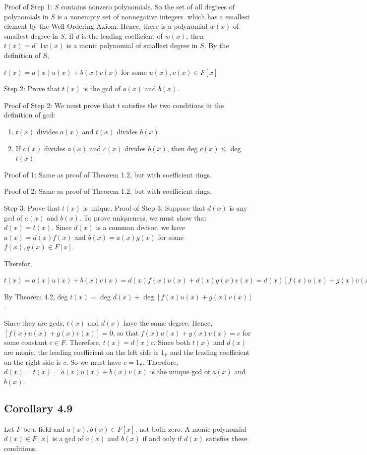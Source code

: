 \documentclass{article}
\begin{document}
Proof of Step 1: $S$ contains nonzero polynomials. So the set of all
degrees of polynomials in $S$ is a nonempty set of nonnegative integers.
which has a smallest element by the Well-Ordering Axiom. Hence, there
is a polynomial $w(x)$ of smallest degree in $S$. If $d$ is the leading coefficient of $w(x)$, then $t(x) = d^-1 w(x)$ 
is a monic polynomial of smallest
degree in $S$. By the definition of $S$,
\begin{center}
    $t(x) = a(x)u(x) + b(x)v(x)$ for some $u(x), v(x) \in F[x]$
\end{center}

Step 2: Prove that $t(x)$ is the gcd of $a(x)$ and $b(x)$.

Proof of Step 2: We must prove that $t$ satisfies the two conditions in the definition of gcd:
\begin{enumerate}
    \item $t(x)$ divides $a(x)$ and $t(x)$ divides $b(x)$
    \item If $c(x)$ divides $a(x)$ and $c(x)$ divides $b(x)$, then deg $c(x) \leq$ deg $t(x)$
\end{enumerate}

Proof of 1: Same as proof of Theorem 1.2, but with coefficient rings.

Proof of 2: Same as proof of Theorem 1.2, but with coefficient rings.

Step 3: Prove that $t(x)$ is unique.
Proof of Step 3: Suppose that $d(x)$ is any gcd of $a(x)$ and $b(x)$. To prove
uniqueness, we must show that $d(x) = t(x)$. Since $d(x)$ is a common divisor,
we have $a(x) = d(x)f(x)$ and $b(x) = a(x)g(x)$ for some $f(x), g(x) \in F[x]$.

Therefor,

$t(x) = a(x)u(x) + b(x)v(x) = d(x)f(x)u(x) + d(x)g(x)v(x) = d(x)[f(x)u(x) + g(x)v(x)]$

By Theorem 4.2, deg $t(x) = $ deg $d(x) + $ deg $[f(x)u(x) + g(x)v(x)]$.

Since they are gcds, $t(x)$ and $d(x)$ have the same degree. Hence, $[f(x)u(x) + g(x)v(x)] = 0 $,
so that $f(x)u(x) + g(x)v(x) = c$ for some constant $c \in F$. Therefore,
$t(x) = d(x)c$. Since both $t(x)$ and $d(x)$ are monic, the leading coefficient on the left side is $1_F$ and the leading
coefficient on the right side is $c$. So we must have $c = 1_F$. Therefore, $d(x)
= t(x) = a(x)u(x) + b(x)v(x)$ is the unique gcd of $a(x)$ and $b(x)$.

\subsection*{Corollary 4.9}
Let $F$ be a field and $a(x), b(x) \in F[x]$, not both zero. A monic polynomial
$d(x) \in F[x]$ is a gcd of $a(x)$ and $b(x)$ if and only if $d(x)$ satisfies these conditions.
\end{document}
